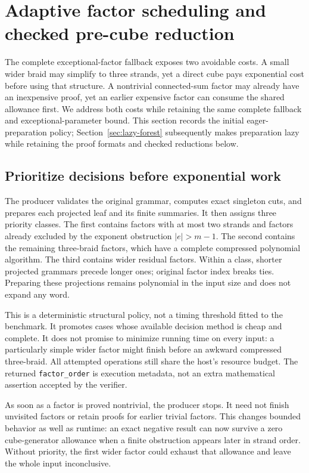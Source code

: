 \section{Adaptive factor scheduling and checked pre-cube reduction}
\label{sec:adaptive-forest}

The complete exceptional-factor fallback exposes two avoidable costs.
A small wider braid may simplify to three strands, yet a direct cube pays
exponential cost before using that structure. A nontrivial connected-sum
factor may already have an inexpensive proof, yet an earlier expensive factor
can consume the shared allowance first. We address both costs while retaining
the same complete fallback and exceptional-parameter bound.
This section records the initial eager-preparation policy;
Section~\ref{sec:lazy-forest} subsequently makes preparation lazy while
retaining the proof formats and checked reductions below.

\subsection{Prioritize decisions before exponential work}

The producer validates the original grammar, computes exact singleton cuts,
and prepares each projected leaf and its finite summaries. It then assigns
three priority classes. The first contains factors with at most two strands
and factors already excluded by the exponent obstruction $|e|>m-1$.
The second contains the remaining three-braid factors, which have a complete
compressed polynomial algorithm. The third contains wider residual factors.
Within a class, shorter projected grammars precede longer ones; original
factor index breaks ties. Preparing these projections remains polynomial in
the input size and does not expand any word.

This is a deterministic structural policy, not a timing threshold fitted to
the benchmark. It promotes cases whose available decision method is cheap
and complete. It does not promise to minimize running time on every input:
a particularly simple wider factor might finish before an awkward compressed
three-braid. All attempted operations still share the host's resource budget.
The returned \texttt{factor\_order} is execution metadata, not an extra
mathematical assertion accepted by the verifier.

As soon as a factor is proved nontrivial, the producer stops. It need not
finish unvisited factors or retain proofs for earlier trivial factors.
This changes bounded behavior as well as runtime: an exact negative result
can now survive a zero cube-generator allowance when a finite obstruction
appears later in strand order. Without priority, the first wider factor
could exhaust that allowance and leave the whole input inconclusive.

